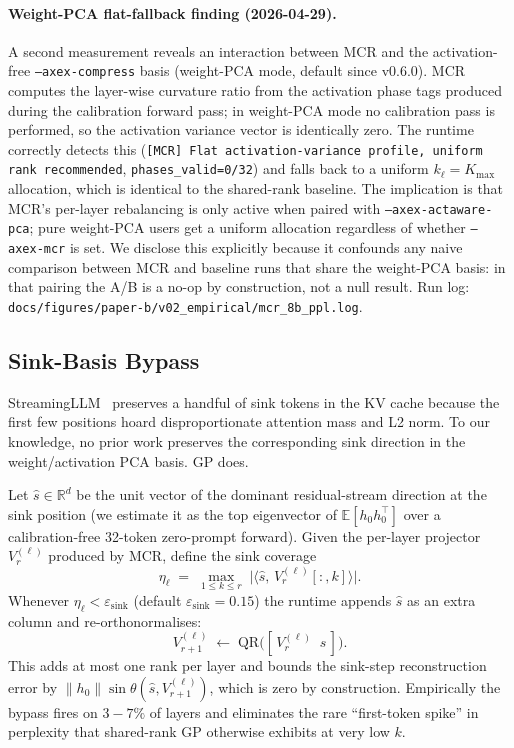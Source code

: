 \documentclass[11pt]{article}
\begin{document}
\paragraph{Weight-PCA flat-fallback finding (2026-04-29).}
A second measurement reveals an interaction between MCR and the
activation-free \texttt{--axex-compress} basis (weight-PCA mode, default
since v0.6.0). MCR computes the layer-wise curvature ratio from the
activation phase tags produced during the calibration forward pass; in
weight-PCA mode no calibration pass is performed, so the activation
variance vector is identically zero. The runtime correctly detects this
(\texttt{[MCR] Flat activation-variance profile, uniform rank
recommended}, \texttt{phases\_valid=0/32}) and falls back to a uniform
$k_\ell{=}K_\text{max}$ allocation, which is identical to the
shared-rank baseline. The implication is that MCR's per-layer
rebalancing is only active when paired with
\texttt{--axex-actaware-pca}; pure weight-PCA users get a uniform
allocation regardless of whether \texttt{--axex-mcr} is set. We disclose
this explicitly because it confounds any naive comparison between MCR
and baseline runs that share the weight-PCA basis: in that pairing the
A/B is a no-op by construction, not a null result. Run log:
\texttt{docs/figures/paper-b/v02\_empirical/mcr\_8b\_ppl.log}.

\subsection{Sink-Basis Bypass}
\label{sec:sink-basis-bypass}
StreamingLLM~\cite{xiao2023streamingllm} preserves a handful of
sink tokens in the KV cache because the first few positions hoard
disproportionate attention mass and L2 norm.  To our knowledge, no prior
work preserves the corresponding sink direction in the
weight/activation PCA basis.  GP does.

Let $\hat s\in\mathbb{R}^d$ be the unit vector of the dominant
residual-stream direction at the sink position (we estimate it as the top
eigenvector of $\mathbb{E}[h_0 h_0^\top]$ over a calibration-free 32-token
zero-prompt forward).  Given the per-layer projector $V_{r}^{(\ell)}$
produced by MCR, define the sink coverage
\begin{equation}
\eta_\ell \;=\; \max_{1\le k\le r}\;\bigl|\langle\hat s,\,V_{r}^{(\ell)}[:,k]\rangle\bigr|.
\end{equation}
Whenever $\eta_\ell < \varepsilon_{\mathrm{sink}}$
(default $\varepsilon_{\mathrm{sink}}=0.15$) the runtime appends $\hat s$ as
an extra column and re-orthonormalises:
\begin{equation}
V_{r+1}^{(\ell)} \;\leftarrow\; \mathrm{QR}\!\bigl([\,V_{r}^{(\ell)}\;\;\hat s\,]\bigr).
\end{equation}
This adds at most one rank per layer and bounds the sink-step
reconstruction error by $\|h_0\|\sin\theta(\hat s, V_{r+1}^{(\ell)})$,
which is zero by construction.  Empirically the bypass fires on $3{-}7\%$
of layers and eliminates the rare ``first-token spike'' in perplexity
that shared-rank GP otherwise exhibits at very low $k$.
\end{document}

